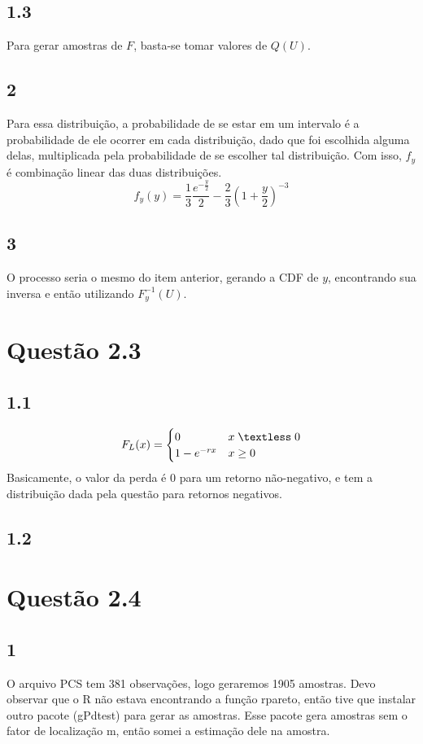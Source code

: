 \documentclass[12pt]{article}
\begin{document}
\subsection*{1.3}
Para gerar amostras de $F$, basta-se tomar valores de $Q(U)$.
\subsection*{2}
Para essa distribuição, a probabilidade de se estar em um intervalo é a probabilidade de ele ocorrer em cada distribuição, dado que foi escolhida alguma delas, multiplicada pela probabilidade de se escolher tal distribuição. Com isso, $f_{y}$ é combinação linear das duas distribuições.
\begin{equation*}
f_{y}(y)=\frac{1}{3}\frac{e^{-\frac{y}{2}}}{2}-
\frac{2}{3}\left(1+\frac{y}{2}\right)^{-3}
\end{equation*}
\subsection*{3}
O processo seria o mesmo do item anterior, gerando a CDF de $y$, encontrando sua inversa e então utilizando $F_{y}^{-1}(U)$.

\section*{Questão 2.3}
\subsection*{1.1}
\begin{equation*}
F_{L}(x)=\begin{cases}
	0 & x\;\textless \;0\\
	1-e^{-rx} & x\geq 0
\end{cases}
\end{equation*}
Basicamente, o valor da perda é 0 para um retorno não-negativo, e tem a distribuição dada pela questão para retornos negativos.

\subsection*{1.2}

\section*{Questão 2.4}
\subsection*{1}
O arquivo PCS tem 381 observações, logo geraremos 1905 amostras. Devo observar que o R não estava encontrando a função rpareto, então tive que instalar outro pacote (gPdtest) para gerar as amostras. Esse pacote gera amostras sem o fator de localização m, então somei a estimação dele na amostra.
\end{document}

